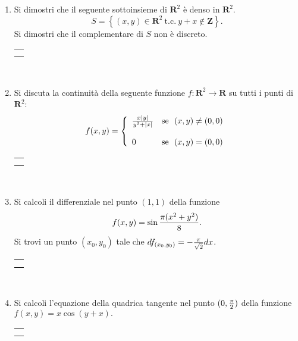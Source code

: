 \documentclass[12pt,a4paper]{report}\pagenumbering{roman}
\begin{document}
\begin{enumerate}
\item Si dimostri che il seguente sottoinsieme di ${\mathbf R}^2$ \`e denso in ${\mathbf R}^2$.
$$S=\left\{(x,y)\in{\mathbf R}^2\ \mbox{t.c.}\ y+x\not\in{\mathbf Z}\right\}.$$
Si dimostri che il complementare di $S$ non \`e discreto.

\hspace*{-3.5cm}\begin{tabular}{c}\hline\\\hspace*{15.7cm}\end{tabular}\\
\hspace*{-3.5cm}{\textbf SVOLGIMENTO:}\pagebreak 

\item Si discuta la continuit\`a della seguente funzione $f:{\mathbf R}^2\longrightarrow
{\mathbf R}$ su tutti i punti di ${\mathbf R}^2$:
$$f(x,y)=\left\{\begin{array}{ll} {x|y|\over y^2+|x|} & 
\mbox{se}\ \ (x,y)\neq (0,0)\\ \\0&\mbox{se}\ \ (x,y)=(0,0)\end{array}\right.$$
\hspace*{-3.5cm}\begin{tabular}{c}\hline\\\hspace*{15.7cm}\end{tabular}\\
\hspace*{-3.5cm}{\textbf SVOLGIMENTO:}\pagebreak
\item Si calcoli il differenziale nel punto $(1,1)$ della funzione 
$$f(x,y)=\sin{\pi(x^2+y^2)\over8}.$$
Si trovi un punto $(x_0,y_0)$ tale che $df_{(x_0,y_0)}=-{\pi\over\sqrt{2}}dx$.

\hspace*{-3.5cm}\begin{tabular}{c}\hline\\\hspace*{15.7cm}\end{tabular}\\
\hspace*{-3.5cm}{\textbf SVOLGIMENTO:}\pagebreak

\item Si calcoli l'equazione della quadrica tangente nel punto $(0,{\pi\over2})$
della funzione $f(x,y)=x\cos(y+x).$  

\hspace*{-3.5cm}\begin{tabular}{c}\hline\\\hspace*{15.7cm}\end{tabular}\\
\hspace*{-3.5cm}{\textbf SVOLGIMENTO:}\pagebreak


\end{enumerate}
\end{document}
